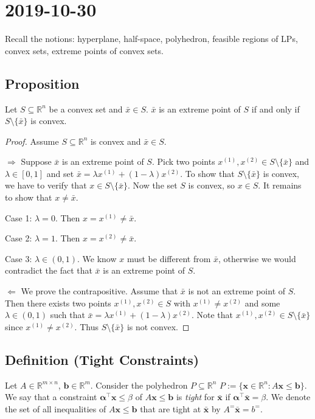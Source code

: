 \section{2019-10-30}
Recall the notions: hyperplane, half-space, polyhedron,
feasible regions of LPs, convex sets, extreme points
of convex sets.

\begin{thmbox}
    \subsection{Proposition}
    Let $ S\subseteq \mathbb{R}^n $ be a convex set and $ \bar{x}\in S $. 
    $ \bar{x} $ is an extreme point of $ S $ if and only if
    $ S\setminus \{\bar{x}\} $ is convex.
\end{thmbox}
\begin{proof}
    Assume $ S\subseteq\mathbb{R}^n $ is convex and $ \bar{x}\in S $.

    $\Rightarrow$
    Suppose $ \bar{x} $ is an extreme point of $ S $. Pick two points
    $ x^{(1)},x^{(2)}\in S\setminus\{\bar{x}\} $ and $ \lambda\in[0,1] $
    and set $\bar{x}=\lambda x^{(1)} + (1-\lambda)x^{(2)}$. To show
    that $ S\setminus\{\bar{x}\} $ is convex, we have to verify that $ x\in S\setminus\{\bar{x}\} $.
    Now the set $ S $ is convex, so $ x\in S $. It remains to show that
    $ x\neq \bar{x} $.

    Case 1: $ \lambda =0 $. Then $ x=x^{(1)}\neq \bar{x} $.

    Case 2: $ \lambda =1 $. Then $ x=x^{(2)}\neq \bar{x} $.

    Case 3: $ \lambda\in(0,1) $. We know $ x $ must be different from
    $ \bar{x} $, otherwise we would contradict the fact that $ \bar{x} $ is
    an extreme point of $ S $.

    $ \Leftarrow $ We prove the contrapositive. Assume that $ \bar{x} $
    is not an extreme point of $ S $. Then there exists two points
    $ x^{(1)},x^{(2)}\in S $ with $ x^{(1)}\neq x^{(2)} $ and some
    $ \lambda\in(0,1) $ such that $\bar{x}=\lambda x^{(1)} + (1-\lambda)x^{(2)}$.
    Note that $ x^{(1)},x^{(2)}\in S\setminus\{\bar{x}\}$ since
    $ x^{(1)}\neq x^{(2)} $. Thus $ S\setminus\{\bar{x}\} $ is not convex.
\end{proof}

\begin{defbox}
    \subsection{Definition (Tight Constraints)}
    Let $ A\in \mathbb{R}^{m \times n} $, $ \bm{b}\in \mathbb{R}^m $. Consider
    the polyhedron $ P\subseteq \mathbb{R}^n $
    $ P:=\{\bm{x}\in\mathbb{R}^n:A\bm{x}\le \bm{b}\} $. We say
    that a constraint $ \bm{\alpha ^\top} \bm{x}\le \beta $ of
    $ A \bm{x}\le \bm{b} $ is \emph{tight} for $ \bm{\bar{x}} $ if
    $ \bm{\alpha}^\top \bm{\bar{x}}=\beta $. We denote the set of all
    inequalities of $ A \bm{x}\le \bm{b} $ that
    are tight at $ \bm{\bar{x}} $ by $ A^=\bm{\bar{x}}=b^= $.
\end{defbox}


